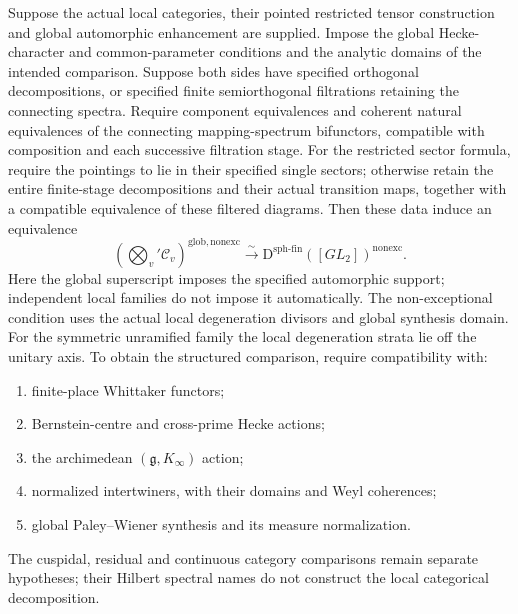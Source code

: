 \begin{theorem}
\label{v4-arith:w6-d:thm:LACD-Eisenstein-nonexc}
Suppose the actual local categories, their pointed restricted tensor
construction and global automorphic enhancement are supplied. Impose
the global Hecke-character and common-parameter conditions and the
analytic domains of the intended comparison. Suppose both sides have
specified orthogonal decompositions, or specified finite semiorthogonal
filtrations retaining the connecting spectra. Require component
equivalences and coherent natural equivalences of the connecting
mapping-spectrum bifunctors, compatible with composition and each
successive filtration stage. For the restricted sector formula,
require the pointings to lie in their specified single sectors;
otherwise retain the entire finite-stage decompositions and their
actual transition maps, together with a compatible equivalence of
these filtered diagrams. Then these data
induce an equivalence
\begin{equation}
\label{v4-arith:w6-d:eq:LACD-Eisenstein-nonexc}
 \left(\bigotimes_v'\mathcal C_v\right)^{\mathrm{glob,nonexc}}
 \xrightarrow{\sim}
 \mathrm D^{\mathrm{sph\text{-}fin}}([GL_2])^{\mathrm{nonexc}}.
\end{equation}
Here the global superscript imposes the specified automorphic support;
independent local families do not impose it automatically. The
non-exceptional condition uses the actual local degeneration divisors
and global synthesis domain. For the symmetric unramified family the
local degeneration strata lie off the unitary axis.
To obtain the structured comparison, require compatibility with:
\begin{enumerate}
\item finite-place Whittaker functors;
\item Bernstein-centre and cross-prime Hecke actions;
\item the archimedean $(\mathfrak g,K_\infty)$ action;
\item normalized intertwiners, with their domains and Weyl coherences;
\item global Paley--Wiener synthesis and its measure normalization.
\end{enumerate}
The cuspidal, residual and continuous category comparisons remain
separate hypotheses; their Hilbert spectral names do not construct
the local categorical decomposition.
\end{theorem}
